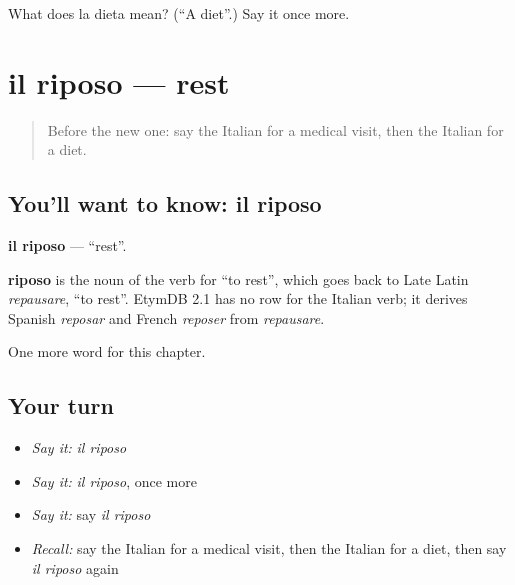 \begin{tcolorbox}[breakable,colback=teal!4,colframe=teal!35!black,title={Before you move on}]
What does la dieta mean? (\textquotedblleft{}A diet\textquotedblright{}.) Say it once more.
\end{tcolorbox}
\section[il riposo]{il riposo — rest}

\label{lesson:IT-C152-riposo}



\begin{quote}
Before the new one: say the Italian for a medical visit, then the Italian for a diet.
\end{quote}

\subsection*{You'll want to know: il riposo}
\textbf{il riposo} — \textquotedblleft{}rest\textquotedblright{}.

\begin{cousinweb}
\textbf{riposo} is the noun of the verb for \textquotedblleft{}to rest\textquotedblright{}, which goes back to Late Latin \emph{repausare}, \textquotedblleft{}to rest\textquotedblright{}. EtymDB 2.1 has no row for the Italian verb; it derives Spanish \emph{reposar} and French \emph{reposer} from \emph{repausare}.
\end{cousinweb}

\begin{grammarlens}[title={What you've built}]
One more word for this chapter.
\end{grammarlens}

\subsection*{Your turn}
\begin{itemize}
\raggedright
  \item \emph{Say it:} \emph{il riposo}
  \item \emph{Say it:} \emph{il riposo}, once more
  \item \emph{Say it:} say \emph{il riposo}
  \item \emph{Recall:} say the Italian for a medical visit, then the Italian for a diet, then say \emph{il riposo} again
\end{itemize}

